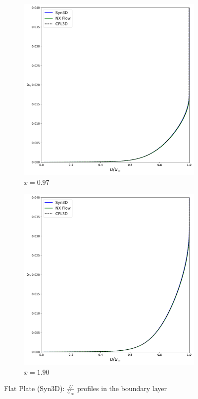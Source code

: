 \begin{figure}[ht!]
\centering
\begin{subfigure}{.45\textwidth}
  \centering
  \includegraphics[width=1.0\textwidth]{figs/flat/u097.pdf}
  \caption{$x=0.97$}
\end{subfigure}%
\begin{subfigure}{.45\textwidth}
  \centering
  \includegraphics[width=1.0\textwidth]{figs/flat/u190.pdf}
  \caption{$x=1.90$}
\end{subfigure}
\caption{Flat Plate (Syn3D): $\frac{U}{U_{\infty}}$ profiles in the boundary layer}
\label{fig:synflatu}
\end{figure}

